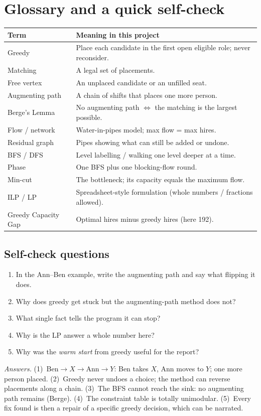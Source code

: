 \documentclass[11pt]{article}
\begin{document}
\section{Glossary and a quick self-check}

\begin{center}\small
\begin{tabular}{@{}p{3.1cm}p{10.4cm}@{}}
\toprule
\textbf{Term} & \textbf{Meaning in this project}\\\midrule
Greedy & Place each candidate in the first open eligible role; never reconsider.\\
Matching & A legal set of placements.\\
Free vertex & An unplaced candidate or an unfilled seat.\\
Augmenting path & A chain of shifts that places one more person.\\
Berge's Lemma & No augmenting path $\Leftrightarrow$ the matching is the largest possible.\\
Flow / network & Water-in-pipes model; max flow = max hires.\\
Residual graph & Pipes showing what can still be added or undone.\\
BFS / DFS & Level labelling / walking one level deeper at a time.\\
Phase & One BFS plus one blocking-flow round.\\
Min-cut & The bottleneck; its capacity equals the maximum flow.\\
ILP / LP & Spreadsheet-style formulation (whole numbers / fractions allowed).\\
Greedy Capacity Gap & Optimal hires minus greedy hires (here 192).\\
\bottomrule
\end{tabular}
\end{center}

\subsection*{Self-check questions}
\begin{enumerate}
 \item In the Ann--Ben example, write the augmenting path and say what flipping it does.
 \item Why does greedy get stuck but the augmenting-path method does not?
 \item What single fact tells the program it can stop?
 \item Why is the LP answer a whole number here?
 \item Why was the \emph{warm start} from greedy useful for the report?
\end{enumerate}
\textit{Answers.} (1)~Ben$\to X\to$Ann$\to Y$: Ben takes $X$, Ann moves to $Y$; one more person placed. (2)~Greedy never undoes a choice; the method can reverse placements along a chain. (3)~The BFS cannot reach the sink: no augmenting path remains (Berge). (4)~The constraint table is totally unimodular. (5)~Every fix found is then a repair of a specific greedy decision, which can be narrated.
\end{document}
